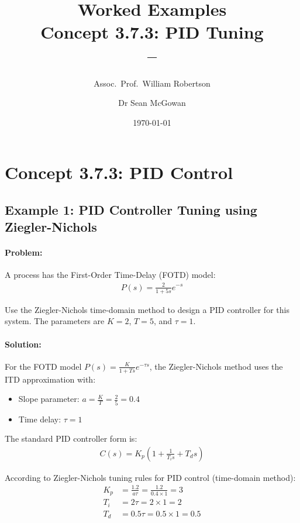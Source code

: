 \documentclass[11pt,a4paper]{article}
\title{\textbf{Worked Examples}\\[0.5em]
\large Concept 3.7.3: PID Tuning\\[0.3em]
\normalsize \coursesubtitle{} -- \coursetitle}
\author{Assoc.\ Prof.\ William Robertson \and Dr Sean McGowan}
\date{\today}
\begin{document}
\maketitle
\tableofcontents
\newpage

\section{Concept 3.7.3: PID Control}

\subsection{Example 1: PID Controller Tuning using Ziegler-Nichols}

\paragraph{Problem:} A process has the First-Order Time-Delay (FOTD) model:
\begin{align}
  P(s) = \frac{2}{1+5s}e^{-s}
\end{align}

Use the Ziegler-Nichols time-domain method to design a PID controller for this system. The parameters are $K = 2$, $T = 5$, and $\tau = 1$.

\paragraph{Solution:}

For the FOTD model $P(s) = \frac{K}{1+Ts}e^{-\tau s}$, the Ziegler-Nichols method uses the ITD approximation with:
\begin{itemize}
  \item Slope parameter: $a = \frac{K}{T} = \frac{2}{5} = 0.4$
  \item Time delay: $\tau = 1$
\end{itemize}

The standard PID controller form is:
\begin{align}
  C(s) = K_p\left(1 + \frac{1}{T_i s} + T_d s\right)
\end{align}

According to Ziegler-Nichols tuning rules for PID control (time-domain method):
\begin{align}
  K_p &= \frac{1.2}{a\tau} = \frac{1.2}{0.4 \times 1} = 3 \\
  T_i &= 2\tau = 2 \times 1 = 2 \\
  T_d &= 0.5\tau = 0.5 \times 1 = 0.5
\end{align}
\end{document}
